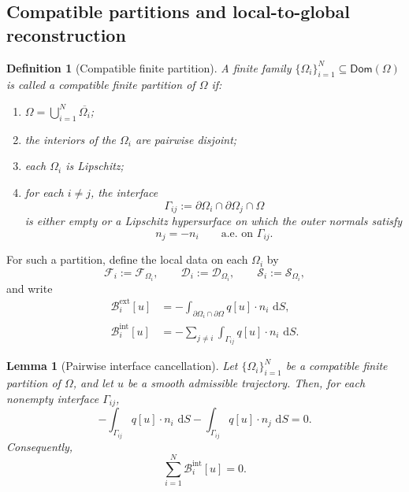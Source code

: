 \documentclass[11pt]{article}
\newtheorem{definition}[theorem]{Definition}
\newtheorem{lemma}[theorem]{Lemma}
\newcommand{\Om}{\Omega}
\newcommand{\pa}{\partial}
\newcommand{\cl}{\overline}
\newcommand{\dd}{\,\mathrm{d}}
\newcommand{\F}{\mathcal{F}}
\newcommand{\Diss}{\mathcal{D}}
\newcommand{\Bnd}{\mathcal{B}}
\newcommand{\Src}{\mathcal{S}}
\begin{document}
\subsection{Compatible partitions and local-to-global reconstruction}

\begin{definition}[Compatible finite partition]\label{def:compatible-partition}
A finite family \(\{\Om_i\}_{i=1}^N\subseteq \mathsf{Dom}(\Om)\) is called a
\emph{compatible finite partition} of \(\Om\) if:
\begin{enumerate}[label=(\roman*),leftmargin=1.1cm]
    \item \(\Om=\bigcup_{i=1}^N \cl{\Om_i}\);
    \item the interiors of the \(\Om_i\) are pairwise disjoint;
    \item each \(\Om_i\) is Lipschitz;
    \item for each \(i\neq j\), the interface
    \[
    \Gamma_{ij}:=\pa\Om_i\cap \pa\Om_j\cap \Om
    \]
    is either empty or a Lipschitz hypersurface on which the outer normals satisfy
    \[
    n_j=-n_i
    \qquad \text{a.e. on }\Gamma_{ij}.
    \]
\end{enumerate}
\end{definition}

For such a partition, define the local data on each \(\Om_i\) by
\[
\F_i:=\F_{\Om_i},\qquad
\Diss_i:=\Diss_{\Om_i},\qquad
\Src_i:=\Src_{\Om_i},
\]
and write
\begin{align}
\Bnd_i^{\mathrm{ext}}[u]
&=
-\int_{\pa\Om_i\cap \pa\Om} q[u]\cdot n_i\,\dd S,\label{eq:Biext}\\
\Bnd_i^{\mathrm{int}}[u]
&=
-\sum_{j\neq i}\int_{\Gamma_{ij}} q[u]\cdot n_i\,\dd S.\label{eq:Biint}
\end{align}

\begin{lemma}[Pairwise interface cancellation]\label{lem:pairwise-cancel}
Let \(\{\Om_i\}_{i=1}^N\) be a compatible finite partition of \(\Om\), and let \(u\)
be a smooth admissible trajectory. Then, for each nonempty interface \(\Gamma_{ij}\),
\begin{equation}\label{eq:pairwise-cancel}
-\int_{\Gamma_{ij}} q[u]\cdot n_i\,\dd S
-
\int_{\Gamma_{ij}} q[u]\cdot n_j\,\dd S
=
0.
\end{equation}
Consequently,
\begin{equation}\label{eq:sum-Bint-zero}
\sum_{i=1}^N \Bnd_i^{\mathrm{int}}[u]=0.
\end{equation}
\end{lemma}
\end{document}

